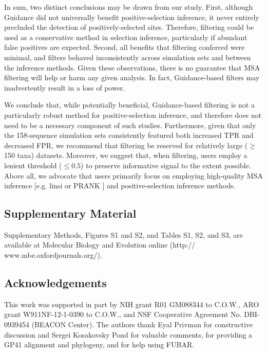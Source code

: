 \documentclass[11pt]{article}
\begin{document}
In sum, two distinct conclusions may be drawn from our study. First, although Guidance did not universally benefit positive-selection inference, it never entirely precluded the detection of positively-selected sites. Therefore, filtering could be used as a conservative method in selection inference, particularly if abundant false positives are expected. Second, all benefits that filtering conferred were minimal, and filters behaved inconsistently across simulation sets and between the inference methods. Given these observations, there is no guarantee that MSA filtering will help or harm any given analysis. In fact, Guidance-based filters may inadvertently result in a loss of power. 

We conclude that, while potentially beneficial, Guidance-based filtering is not a particularly robust method for positive-selection inference, and therefore does not need to be a necessary component of such studies. Furthermore, given that only the 158-sequence simulation sets consistently featured both increased TPR and decreased FPR, we recommend that filtering be reserved for relatively large ($\geq$ 150 taxa) datasets. Moreover, we suggest that, when filtering, users employ a lenient threshold ($\leq0.5$) to preserve informative signal to the extent possible. Above all, we advocate that users primarily focus on employing high-quality MSA inference [e.g. linsi \citep{Katoh2005} or PRANK \citep{Loytynoja2008}] and positive-selection inference methods. 


\subsection*{Supplementary Material}
Supplementary Methods, Figures S1 and S2, and Tables S1, S2, and S3, are available at Molecular Biology and Evolution online (http:// www.mbe.oxfordjournals.org/).


\subsection*{Acknowledgements}
 This work was supported in part by NIH grant R01 GM088344 to C.O.W., ARO grant W911NF-12-1-0390 to  C.O.W.,  and NSF Cooperative Agreement No. DBI-0939454 (BEACON Center). The authors thank Eyal Privman for constructive discussion and Sergei Kosakovsky Pond for valuable comments, for providing a GP41 alignment and phylogeny, and for help using FUBAR.



	
\end{document}
